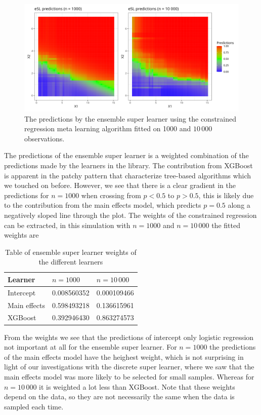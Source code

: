 \documentclass[./main.tex]{subfiles}
\begin{document}
\begin{figure}[H]
    \centering
    \includegraphics[width=\textwidth]{figures/esl_preds_par.png}
    \caption{The predictions by the ensemble super learner using the constrained regression meta learning algorithm fitted on 1000 and $ 10\,000 $ observations.}
    \label{fig:esl_preds_quad_prog}
\end{figure}
The predictions of the ensemble super learner is a weighted combination of the predictions made by the learners in the library. The contribution from XGBoost is apparent in the patchy pattern that characterize tree-based algorithms which we touched on before. However, we see that there is a clear gradient in the predictions for $ n = 1000 $ when crossing from $ p < 0.5 $ to $ p > 0.5 $, this is likely due to the contribution from the main effects model, which predicts $ p = 0.5 $ along a negatively sloped line through the plot. The weights of the constrained regression can be extracted, in this simulation with $ n = 1000 $ and $ n = 10\,000 $ the fitted weights are
\begin{table}[H]
\centering
\begin{tabular}{lll}
\hline
Learner & $ n = 1000 $ & $ n = 10\,000 $\\
\hline
Intercept & 0.008560352 & 0.000109466 \\
Main effects & 0.598493218 & 0.136615961 \\
XGBoost & 0.392946430 & 0.863274573 \\
\hline
\end{tabular}
\caption{Table of ensemble super learner weights of the different learners}
\end{table}
From the weights we see that the predictions of intercept only logistic regression not important at all for the ensemble super learner. For $ n = 1000 $ the predictions of the main effects model have the heighest weight, which is not surprising in light of our investigations with the discrete super learner, where we saw that the main effects model was more likely to be selected for small samples. Whereas for $ n = 10\,000 $ it is weighted a lot less than XGBoost. Note that these weights depend on the data, so they are not necessarily the same when the data is sampled each time. 
\end{document}
